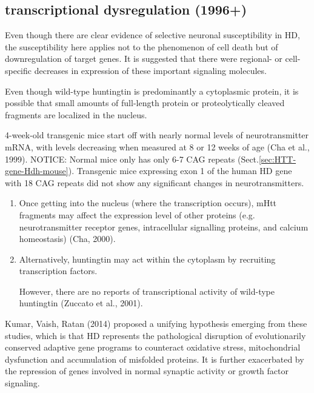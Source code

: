 \subsection{transcriptional dysregulation (1996+)}
\label{sec:HD-theory-transcription-dysfunction}

Even though there are clear evidence of selective neuronal susceptibility in HD,
the susceptibility here applies not to the phenomenon of cell death but of
downregulation of target genes.
It is suggested that there were regional- or cell-specific decreases in
expression of these important signaling molecules.

Even though wild-type huntingtin is predominantly a cytoplasmic protein, it is
possible that small amounts of full-length protein or proteolytically cleaved
fragments are localized in the nucleus.

4-week-old transgenic mice start off with nearly normal levels of
neurotransmitter mRNA, with levels decreasing when measured at 8 or 12 weeks of
age (Cha et al., 1999).
NOTICE: Normal mice only has only 6-7 CAG repeats
(Sect.\ref{sec:HTT-gene-Hdh-mouse}). Transgenic mice expressing exon 1 of the
human HD gene with 18 CAG repeats did not show any significant changes in
neurotransmitters.

\begin{enumerate}
  
  \item Once getting into the nucleus (where the transcription occurs), mHtt
  fragments may affect the expression level of other proteins (e.g.
  neurotransmitter receptor genes, intracellular signalling proteins, and
  calcium homeostasis) (Cha, 2000).

   \item Alternatively, huntingtin may act within the cytoplasm by recruiting
   transcription factors.
   
However, there are no reports of transcriptional activity of wild-type
huntingtin (Zuccato et al., 2001).

\end{enumerate}


Kumar, Vaish, Ratan (2014) proposed a unifying hypothesis emerging from these
studies, which is that HD represents the pathological disruption of
evolutionarily conserved adaptive gene programs to counteract oxidative stress,
mitochondrial dysfunction and accumulation of misfolded proteins.
It is further exacerbated by the repression of genes involved in normal synaptic
activity or growth factor signaling.

